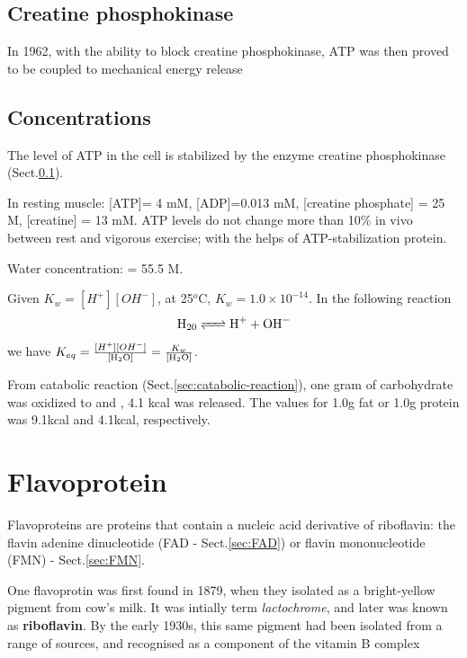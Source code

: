 \subsection{Creatine phosphokinase}
\label{sec:creatine-phosphokinase}

In 1962, with the ability to block creatine phosphokinase, ATP
was then proved to be coupled to mechanical energy release


\subsection{Concentrations}
\label{sec:concentrations-ATP}
\label{sec:concentrations-ADP}
\label{sec:concentrations-Creatine}
\label{sec:concentrations-H2O}

The level of ATP in the cell is stabilized by the enzyme creatine phosphokinase
(Sect.\ref{sec:creatine-phosphokinase}).


In resting muscle: [ATP]= 4 mM, [ADP]=0.013 mM, [creatine phosphate] = 25 M,
[creatine] = 13 mM. ATP levels do not change more than 10\% in vivo between rest
and vigorous exercise; with the helps of ATP-stabilization protein.

Water concentration: \ce{[H2O]} = 55.5 M.

Given $K_w = [H^+][OH^-]$, at 25$^o$C, $K_w = 1.0 \times 10^{-14}$. In
the following reaction
\begin{equation}
  \label{eq:5}
  \ce{H20 <=> H+ + OH-}
\end{equation}
we have $K_{eq} = \frac{[H^+][OH^-]}{[\ce{H2O}]} = \frac{K_w}{[\ce{H2O}]}$.

From catabolic reaction (Sect.\ref{sec:catabolic-reaction}), one gram of
carbohydrate was oxidized to  and , 4.1 kcal was released. The
values for 1.0g fat or 1.0g protein was 9.1kcal and 4.1kcal, respectively.

\section{Flavoprotein}
\label{sec:flavoprotein}

Flavoproteins are proteins that contain a nucleic acid derivative of riboflavin:
the flavin adenine dinucleotide (FAD - Sect.\ref{sec:FAD}) or flavin
mononucleotide (FMN) - Sect.\ref{sec:FMN}.

One flavoprotin was first found in 1879, when they isolated as a bright-yellow
pigment from cow's milk. It was intially term {\it lactochrome}, and later was
known as {\bf riboflavin}.
By the early 1930s, this same pigment had been isolated from a range of sources, and
recognised as a component of the vitamin B complex

